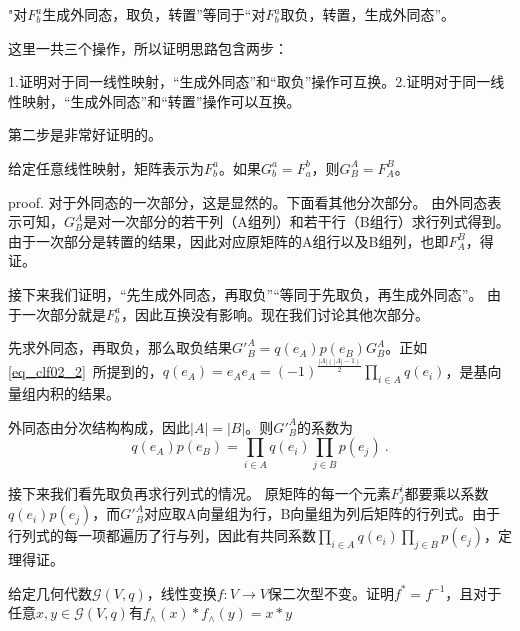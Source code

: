 "对$F^a_b$生成外同态，取负，转置”等同于“对$F^a_b$取负，转置，生成外同态”。

这里一共三个操作，所以证明思路包含两步：

1.证明对于同一线性映射，“生成外同态”和“取负”操作可互换。2.证明对于同一线性映射，“生成外同态”和“转置”操作可以互换。

第二步是非常好证明的。
\begin{lemma}{}
给定任意线性映射，矩阵表示为$F^a_b$。如果$G^a_b=F^b_a$，则$G^A_B=F^B_A$。
\end{lemma}
proof.
对于外同态的一次部分，这是显然的。下面看其他分次部分。
由外同态表示可知，$G^A_B$是对一次部分的若干列（A组列）和若干行（B组行）求行列式得到。由于一次部分是转置的结果，因此对应原矩阵的A组行以及B组列，也即$F^B_A$，得证。

接下来我们证明，“先生成外同态，再取负”“等同于先取负，再生成外同态”。
由于一次部分就是$F^a_b$，因此互换没有影响。现在我们讨论其他次部分。

先求外同态，再取负，那么取负结果$G'^A_B=q(e_A)p(e_B)G^A_B$。正如\autoref{eq_clf02_2}~所提到的，$q(e_A)=e_Ae_A=
(-1)^{\frac{|A|(|A|-1)}{2}} \prod_{i \in A} q(e_i)$，是基向量组内积的结果。

外同态由分次结构构成，因此$|A|=|B|$。则$G'^A_B$的系数为
\begin{equation}
q(e_A)p(e_B)=\prod_{i \in A} q(e_i)\prod_{j \in B} p(e_j)~.
\end{equation}

接下来我们看先取负再求行列式的情况。
原矩阵的每一个元素$F^i_j$都要乘以系数$q(e_i)p(e_j)$，而$G'^A_B$对应取A向量组为行，B向量组为列后矩阵的行列式。由于行列式的每一项都遍历了行与列，因此有共同系数$\prod_{i \in A} q(e_i)\prod_{j \in B} p(e_j)$，定理得证。


\begin{exercise}{}
给定几何代数$\mathcal G(V,q)$，线性变换$f:V\rightarrow V$保二次型不变。证明$f^*=f^{-1}$，且对于任意$x,y\in\mathcal G(V,q)$有$f_{\wedge}(x)*f_{\wedge}(y)=x*y$
\end{exercise}
